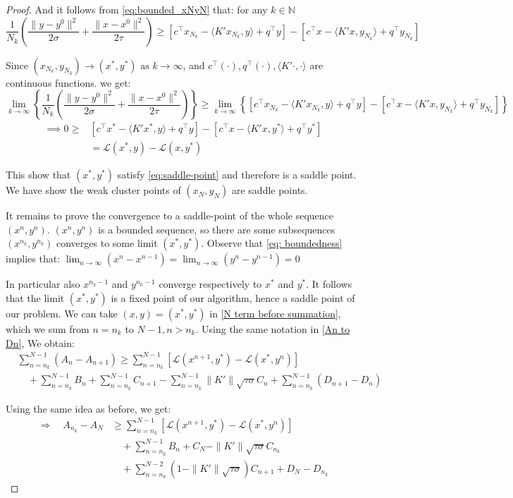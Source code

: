 \documentclass[twoside,12pt,openright]{report}  %
\begin{document}
\begin{proof}
And it follows from \eqref{eq:bounded_xNyN} that: for any \(k \in \mathbb{N}\)
\[
\frac{1}{{N_k}}(\frac{\|y - y^{0}\|^2}{2\sigma} + \frac{\|x - x^0\|^2}{2\tau}) \ge  [c^\top x_{N_k} - \langle K'x_{N_k}, y \rangle + q^\top y] - [c^\top x - \langle K'x, y_{N_k} \rangle + q^\top y_{N_k} ]
\]

Since \((x_{N_k},y_{N_k}) \to (x^*,y^*) \text{ as }k\to \infty \), and \(c^\top (\cdot), q^\top (\cdot),  \langle K'\cdot, \cdot \rangle \) are continuous functions. we get:
\[
\lim_{k\to \infty}\left\{ \frac{1}{{N_k}}(\frac{\|y - y^{0}\|^2}{2\sigma} + \frac{\|x - x^0\|^2}{2\tau}) \right \} \ge  \lim_{k\to \infty}\left\{ [c^\top x_{N_k} - \langle K'x_{N_k}, y \rangle + q^\top y] - [c^\top x - \langle K'x, y_{N_k} \rangle + q^\top y_{N_k} ] \right \}
\]
\[
\begin{aligned}
    \implies 0\ge& [c^\top x^* - \langle K'x^*, y \rangle + q^\top y] - [c^\top x - \langle K'x, y^* \rangle + q^\top y^* ]\\
    &= \mathcal{L}(x^*,y) - \mathcal{L}(x,y^*)
\end{aligned}
\]

This show that \((x^*,y^*)\) satisfy \eqref{eq:saddle-point} and therefore is a saddle point. We have show the weak cluster points of \((x_N,y_N)\) are saddle points.

It remains to prove the convergence to a saddle-point of the whole sequence \((x^n,y^n)\).  \((x^n,y^n)\) is a bounded sequence, so there are some subsequences \((x^{n_k},y^{n_k})\) converges to some limit \((x^*,y^*)\). Observe that \eqref{eq: boundedness} implies that: \(\lim_{n \to \infty} (x^n-x^{n-1}) = \lim_{n \to \infty} (y^n-y^{n-1}) = 0\)

In particular also \(x^{n_k-1}\) and \(y^{n_k-1}\) converge respectively to \(x^*\) and \(y^*\). It follows that the limit \((x^*,y^*)\) is a fixed point of our algorithm, hence a saddle point of our problem. We can take \((x,y) =(x^*,y^*)\) in \eqref{N term before summation}, which we sum from \(n=n_k\) to \(N-1, n>n_k\). Using the same notation in \eqref{An to Dn}, We obtain:
\begin{align*}
&\sum_{n=n_k}^{N-1}(A_n - A_{n+1}) \ge 
\sum_{n=n_k}^{N-1} \left[ \mathcal{L}(x^{n+1},y^*)- \mathcal{L}(x^*,y^n) \right] \\
&\quad + \sum_{n=n_k}^{N-1} B_n + \sum_{n=n_k}^{N-1} C_{n+1} - \sum_{n=n_k}^{N-1} \|K'\|\sqrt{\tau\sigma}  C_n + \sum_{n=n_k}^{N-1} (D_{n+1} - D_n)
\end{align*}

Using the same idea as before, we get:
\begin{align*}
\Rightarrow\quad
A_{n_k} - A_N &\ge 
\sum_{n=n_k}^{N-1} \left[ \mathcal{L}(x^{n+1},y^*)- \mathcal{L}(x^*,y^n) \right] \\
&\quad + \sum_{n=n_k}^{N-1} B_n + C_N - \|K'\|\sqrt{\tau\sigma}  C_{n_k} \\
&\quad + \sum_{n=n_k}^{N-2} (1 - \|K'\|\sqrt{\tau\sigma})  C_{n+1} + D_N - D_{n_k}
\end{align*}


\end{proof}
\end{document}
